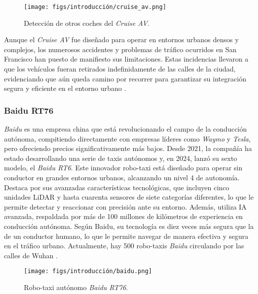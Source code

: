 \begin{figure}[ht]
  \begin{center}
    \texttt{[image: figs/introducción/cruise\_av.png]}
  \end{center}
  \caption{Detección de otros coches del \textit{Cruise AV}.}
  \label{cruise}
\end{figure}

Aunque el \textit{Cruise AV} fue diseñado para operar en entornos urbanos densos y complejos, los numerosos accidentes y problemas de tráfico ocurridos en San Francisco han puesto de manifiesto sus limitaciones. Estas incidencias llevaron a que los vehículos fueran retirados indefinidamente de las calles de la ciudad, evidenciando que aún queda camino por recorrer para garantizar su integración segura y eficiente en el entorno urbano \cite{robotaxis-cruise}.

\subsubsection{Baidu RT76}

\textit{Baidu} es una empresa china que está revolucionando el campo de la conducción autónoma, compitiendo directamente con empresas líderes como \textit{Waymo} y \textit{Tesla}, pero ofreciendo precios significativamente más bajos. Desde 2021, la compañía ha estado desarrollando una serie de taxis autónomos y, en 2024, lanzó su sexto modelo, el \textit{Baidu RT6}. Este innovador robo-taxi está diseñado para operar sin conductor en grandes entornos urbanos, alcanzando un nivel 4 de autonomía. Destaca por sus avanzadas características tecnológicas, que incluyen cinco unidades \ac{LiDAR} y hasta cuarenta sensores de siete categorías diferentes, lo que le permite detectar y reaccionar con precisión ante su entorno. Además, utiliza \ac{IA} avanzada, respaldada por más de 100 millones de kilómetros de experiencia en conducción autónoma. Según Baidu, su tecnología es diez veces más segura que la de un conductor humano, lo que le permite navegar de manera efectiva y segura en el tráfico urbano. Actualmente, hay 500 robo-taxis \textit{Baidu} circulando por las calles de Wuhan \cite{baidu}.

\begin{figure}[ht]
  \begin{center}
    \texttt{[image: figs/introducción/baidu.png]}
  \end{center}
  \caption{Robo-taxi autónomo \textit{Baidu RT76}.}
  \label{cruise}
\end{figure}

